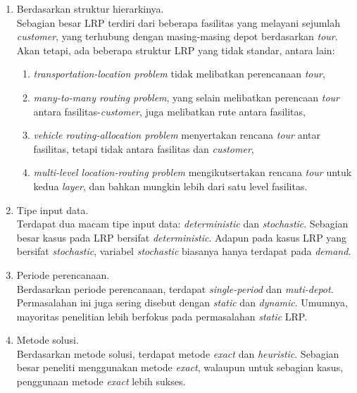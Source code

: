 \begin{enumerate}
\item Berdasarkan struktur hierarkinya.\\
	Sebagian besar LRP terdiri dari beberapa fasilitas yang melayani sejumlah \textit{customer}, yang terhubung dengan masing-masing depot berdasarkan \textit{tour}. Akan tetapi, ada beberapa struktur LRP yang tidak standar, antara lain: 
	\begin{enumerate}
	\item \textit{transportation-location problem} tidak melibatkan perencanaan \textit{tour}, 
	\item \textit{many-to-many routing problem}, yang selain melibatkan perencaan \textit{tour} antara fasilitas-\textit{customer}, juga melibatkan rute antara fasilitas, 
	\item \textit{vehicle routing-allocation problem} menyertakan rencana \textit{tour} antar fasilitas, tetapi tidak antara fasilitas dan \textit{customer}, 
	\item \textit{multi-level location-routing problem} mengikutsertakan rencana \textit{tour} untuk kedua \textit{layer}, dan bahkan mungkin lebih dari satu level fasilitas.
	\end{enumerate}
\item Tipe input data. \\
	Terdapat dua macam tipe input data: \textit{deterministic} dan \textit{stochastic}. Sebagian besar kasus pada LRP bersifat \textit{deterministic}. Adapun pada kasus LRP yang bersifat \textit{stochastic}, variabel \textit{stochastic} biasanya hanya terdapat pada \textit{demand}.
\item Periode perencanaan. \\
	Berdasarkan periode perencanaan, terdapat \textit{single-period} dan \textit{muti-depot}. Permasalahan ini juga sering disebut dengan \textit{static} dan \textit{dynamic}. Umumnya, mayoritas penelitian lebih berfokus pada permasalahan \textit{static} LRP.
\item Metode solusi. \\
	Berdasarkan metode solusi, terdapat metode \textit{exact} dan \textit{heuristic}. Sebagian besar peneliti menggunakan metode \textit{exact}, walaupun untuk sebagian kasus, penggunaan metode \textit{exact} lebih sukses.
\end{enumerate}


